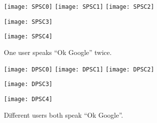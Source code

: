 \newpage
\begin{figure}[H]
	\centering
	\begin{minipage}[t]{.8\linewidth}
		\centering
		\texttt{[image: SPSC0]}
		\vspace{-.2in}
		\vspace{.2in}
		\texttt{[image: SPSC1]}
		\texttt{[image: SPSC2]}
		\vspace{-.2in}
		\vspace{.2in}
	\end{minipage}
	\begin{minipage}[t]{.45\linewidth}
		\centering
		\texttt{[image: SPSC3]}
		\vspace{-.2in}
	\end{minipage}
	\begin{minipage}[t]{.45\linewidth}
		\centering
		\texttt{[image: SPSC4]}
		\vspace{-.2in}
	\end{minipage}
	\caption{One user speaks ``Ok Google'' twice.}
	\label{fig:SPSC}
\end{figure}
%
\newpage
\begin{figure}[H]
	\centering
	\begin{minipage}[t]{.8\linewidth}
		\centering
		\texttt{[image: DPSC0]}
		\vspace{-.2in}
		\vspace{.2in}
		\texttt{[image: DPSC1]}
		\texttt{[image: DPSC2]}
		\vspace{-.2in}
		\vspace{.2in}
	\end{minipage}
	\begin{minipage}[t]{.45\linewidth}
		\centering
		\texttt{[image: DPSC3]}
		\vspace{-.2in}
		\label{fig:DPSCc}
	\end{minipage}
	\begin{minipage}[t]{.45\linewidth}
		\centering
		\texttt{[image: DPSC4]}
		\vspace{-.2in}
		\label{fig:DPSCd}
	\end{minipage}
	\caption{Different users both speak ``Ok Google''.}
	\label{fig:DPSC}
\end{figure}
